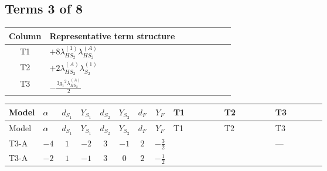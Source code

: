 \documentclass[8pt]{article}
\begin{document}
\begin{landscape}
\subsection*{Terms 3 of 8}
\begin{center}
\begin{tabular}{@{}c >{\raggedright\arraybackslash}p{0.82\linewidth}@{}}
\toprule
Column & Representative term structure \\
\midrule
T1 & \(\displaystyle +8 {\lambda_{HS_2}^{(1)}} {\lambda_{HS_2}^{(A)}}\) \\
\midrule
T2 & \(\displaystyle +2 {\lambda_{HS_2}^{(A)}} {\lambda_{S_2}^{(1)}}\) \\
\midrule
T3 & \(\displaystyle -\frac{3 {g_1}^2 {\lambda_{HS_2}^{(A)}}}{2}\) \\
\midrule
\bottomrule
\end{tabular}
\end{center}
\smallskip
\tiny
\begin{longtable}{@{}llcccccc >{\raggedright\arraybackslash}p{0.21\linewidth} >{\raggedright\arraybackslash}p{0.21\linewidth} >{\raggedright\arraybackslash}p{0.21\linewidth}@{}}
\toprule
Model & $\alpha$ & $d_{S_1}$ & $Y_{S_1}$ & $d_{S_2}$ & $Y_{S_2}$ & $d_F$ & $Y_F$ & T1 & T2 & T3 \\
\midrule
\endfirsthead
\toprule
Model & $\alpha$ & $d_{S_1}$ & $Y_{S_1}$ & $d_{S_2}$ & $Y_{S_2}$ & $d_F$ & $Y_F$ & T1 & T2 & T3 \\
\midrule
\endhead
T3-A & $-4$ & $1$ & $-2$ & $3$ & $-1$ & $2$ & $-\frac{3}{2}$ & \scriptsize\adjustbox{max width=\linewidth}{$\begin{gathered} +8 {\lambda_{HS_2}^{(1)}} {\lambda_{HS_2}^{(A)}}\end{gathered}$} & \scriptsize\adjustbox{max width=\linewidth}{$\begin{gathered} +2 {\lambda_{HS_2}^{(A)}} {\lambda_{S_2}^{(1)}}\end{gathered}$} & --- \\
\midrule
T3-A & $-2$ & $1$ & $-1$ & $3$ & $0$ & $2$ & $-\frac{1}{2}$ & \scriptsize\adjustbox{max width=\linewidth}{$\begin{gathered} +8 {\lambda_{HS_2}^{(1)}} {\lambda_{HS_2}^{(A)}}\end{gathered}$} & \scriptsize\adjustbox{max width=\linewidth}{$\begin{gathered} +2 {\lambda_{HS_2}^{(A)}} {\lambda_{S_2}^{(1)}}\end{gathered}$} & \scriptsize\adjustbox{max width=\linewidth}{$\begin{gathered} -\frac{3 {g_1}^2 {\lambda_{HS_2}^{(A)}}}{2}\end{gathered}$} \\

\end{longtable}
\end{landscape}
\end{document}

